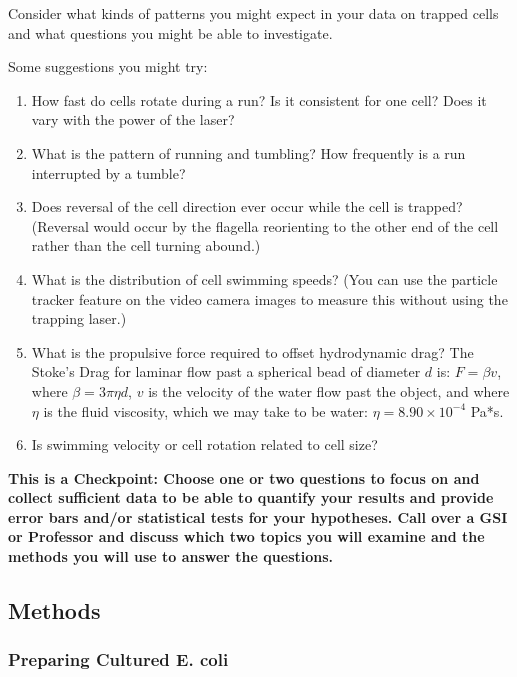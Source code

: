\documentclass{../lab}
\begin{document}
Consider what kinds of patterns you might expect in your data on trapped cells and what questions you might be able to investigate.

Some suggestions you might try:

\begin{enumerate}
    \item How fast do cells rotate during a run? Is it consistent for one cell? Does it vary with the power of the laser?

    \item What is the pattern of running and tumbling? How frequently is a run interrupted by a tumble?

    \item Does reversal of the cell direction ever occur while the cell is trapped? (Reversal would occur by the flagella reorienting to the other end of the cell rather than the cell turning abound.)

    \item What is the distribution of cell swimming speeds? (You can use the particle tracker feature on the video camera images to measure this without using the trapping laser.)

    \item What is the propulsive force required to offset hydrodynamic drag? The Stoke's Drag for laminar flow past a spherical bead of diameter $d$ is: $F = \beta v$, where $\beta = 3\pi\eta d$, $v$ is the velocity of the water flow past the object, and where $\eta$ is the fluid viscosity, which we may take to be water: $\eta = 8.90 \times 10^{-4}$ Pa*s.

    \item Is swimming velocity or cell rotation related to cell size?

\end{enumerate}


\textbf{This is a Checkpoint: Choose one or two questions to focus on and collect sufficient data to be able to quantify your results and provide error bars and/or statistical tests for your hypotheses. Call over a GSI or Professor and discuss which two topics you will examine and the methods you will use to answer the questions.}

\subsection{Methods}

\subsubsection{Preparing Cultured E. coli}
\end{document}
